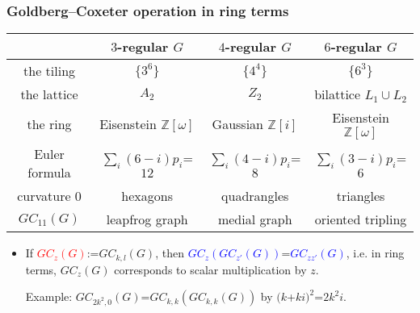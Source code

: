 \documentclass{beamer}
\newcommand{\ZZ}{\ensuremath{\mathbb{Z}}}
\begin{document}
\begin{frame}\frametitle{Goldberg--Coxeter operation in ring terms}

\begin{center}
{\small
\begin{tabular}{||c|c|c|c||}
\hline\hline
   &$3$-regular $G$& $4$-regular
$G$ &$6$-regular $G$\\\hline
the  tiling& $\{3^6\}$&  $\{4^4\}$&$\{6^3\}$\\
the lattice& $A_2$& $Z_2$&bilattice $L_1\cup L_2$\\
the ring           &Eisenstein
$\ZZ[\omega]$ &Gaussian
$\ZZ[i]$&Eisenstein
$\ZZ[\omega]$\\
Euler formula  &$\sum_{i} (6-i)p_i$=$12$
&$\sum_{i}
(4-i)p_i$=$8$&$\sum_{i} (3-i)p_i$=$6$\\
curvature $0$&hexagons
&quadrangles&triangles\\
$GC_{11}(G)$      &leapfrog graph
    &medial graph& oriented tripling\\
\hline\hline\end{tabular}
}
\end{center}\pause

\begin{itemize}
\item If \textcolor{red}{$GC_{z}(G)$}:=$GC_{k,l}(G)$, then
\textcolor{blue}{$GC_{z}(GC_{z'}(G))$}=\textcolor{blue}{$GC_{zz'}(G)$}, i.e. in
ring terms, 
$GC_{z}(G)$ corresponds to scalar 
multiplication by 
$z$.

Example: 
$GC_{2k^2,0}(G)$=$GC_{k,k}(GC_{k,k}(G))$
 by
$(k$+$ki)^2$=$2k^2i$.


\end{itemize}
\end{frame}
\end{document}
